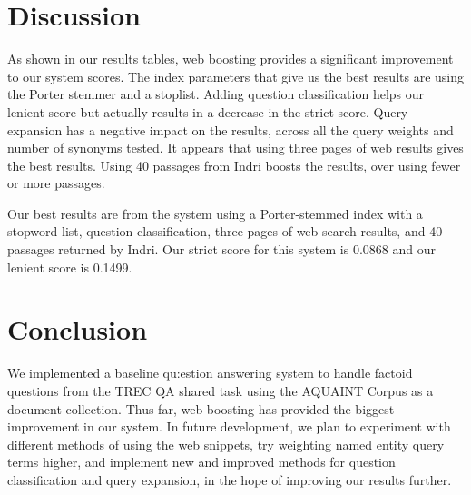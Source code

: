 \documentclass[11pt]{article}
\begin{document}
\section{Discussion}

As shown in our results tables, web boosting provides a significant improvement to our system scores.  The index parameters that give us the best results are using the Porter stemmer and a stoplist.  Adding question classification helps our lenient score but actually results in a decrease in the strict score.  Query expansion has a negative impact on the results, across all the query weights and number of synonyms tested.  It appears that using three pages of web results gives the best results.  Using 40 passages from Indri boosts the results, over using fewer or more passages.

Our best results are from the system using a Porter-stemmed index with a stopword list, question classification, three pages of web search results, and 40 passages returned by Indri.  Our strict score for this system is 0.0868 and our lenient score is 0.1499.

\section{Conclusion}

We implemented a baseline qu:estion answering system to handle factoid questions from the TREC QA shared task using the AQUAINT Corpus as a document collection. Thus far, web boosting has provided the biggest improvement in our system. In future development, we plan to experiment with different methods of using the web snippets, try weighting named entity query terms higher, and implement new and improved methods for question classification and query expansion, in the hope of improving our results further.

\nocite{*}




\end{document}
